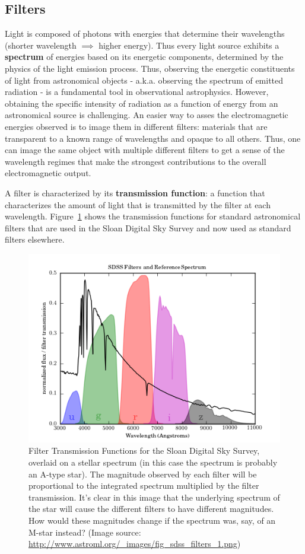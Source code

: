 \subsection{Filters}
Light is composed of photons with energies that determine their wavelengths (shorter wavelength $\implies$ higher energy). Thus every light source exhibits a \textbf{spectrum} of energies based on its energetic components, determined by the physics of the light emission process. Thus, observing the energetic constituents of light from astronomical objects - a.k.a. observing the spectrum of emitted radiation - is a fundamental tool in observational astrophysics. However, obtaining the specific intensity of radiation as a function of energy from an astronomical source is challenging. An easier way to asses the electromagnetic energies observed is to image them in different filters: materials that are transparent to a known range of wavelengths and opaque to all others. Thus, one can image the same object with multiple different filters to get a sense of the wavelength regimes that make the strongest contributions to the overall electromagnetic output.

A filter is characterized by its \textbf{transmission function}: a function that characterizes the amount of light that is transmitted by the filter at each wavelength. Figure~\ref{sot:fig:filters} shows the transmission functions for standard astronomical filters that are used in the Sloan Digital Sky Survey and now used as standard filters elsewhere.%

\begin{figure}
	\centering
	\includegraphics{small-optical-telescopes/fig_sdss_filters_1.png}
	\caption{Filter Transmission Functions for the Sloan Digital Sky Survey, overlaid on a stellar spectrum (in this case the spectrum is probably an
		A-type star). The magnitude observed by each filter will be proportional to the integrated spectrum multiplied by the filter transmission. It's clear in this image that the underlying spectrum of the star will cause the different filters to have different magnitudes. How would these magnitudes change if the spectrum was, say, of an M-star instead? (Image source: \url{http://www.astroml.org/\_images/fig\_sdss\_filters\_1.png})}\label{sot:fig:filters}
\end{figure}

